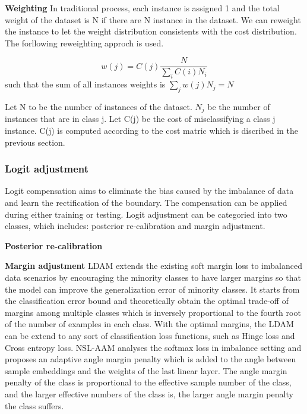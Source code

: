\textbf{Weighting}
In traditional process, each instance is assigned 1 and the total weight of the dataset is N if there are N instance in the dataset. We can reweight the instance to let the weight distribution consistents with the cost distribution. The forllowing reweighting approch is used.

\begin{equation}
    w(j)=C(j)\frac{N}{\sum_{i}C(i)N_i}
\end{equation}
such that the sum of all instances weights is $ \sum_{j}w(j)N_j = N $

Let N to be the number of instances of the dataset. $N_j$ be the number of instances that are in class j. Let C(j) be the cost of misclassifying a class j instance. C(j) is computed according to
the cost matric which is discribed in the previous section.


\subsubsection{Logit adjustment}
Logit compensation aims to eliminate the bias caused by the imbalance of data and learn the rectification of the boundary. The compensation can be applied during either training or testing.
Logit adjustment can be categoried into two classes, which includes: posterior re-calibration and margin adjustment.

\textbf{Posterior re-calibration}

\textbf{Margin adjustment}
LDAM \cite{cao2019learning} extends the existing soft margin loss to imbalanced data scenarios by encouraging the minority classes to have larger margins so that the model can improve the generalization error of minority classes. It starts from the classification error bound and theoretically obtain the optimal trade-off of margins among multiple classes which is inversely proportional to the fourth root of the number of examples in each class. With the optimal margins, the LDAM can be extend to any sort of classification loss functions, such as Hinge loss and Cross entropy loss.
NSL-AAM \cite{} analyses the softmax loss in imbalance setting and proposes an adaptive angle margin penalty which is added to the angle between sample embeddings and the weights of the last linear layer. The angle margin penalty of the class is proportional to the effective sample number of the class, and the larger effective numbers of the class is, the larger angle margin penalty the class suffers.



